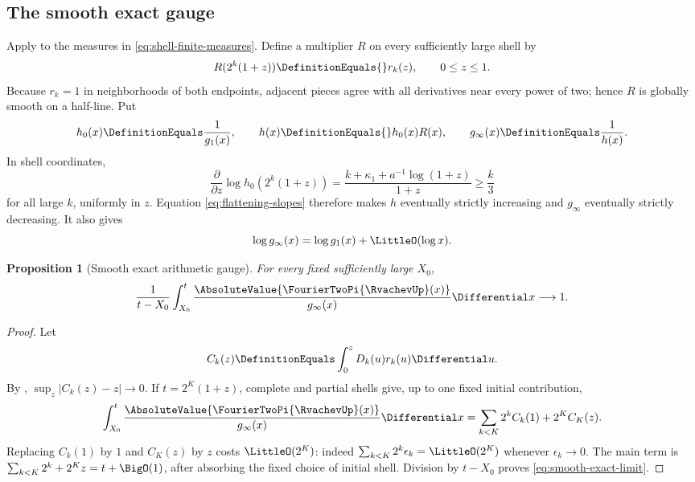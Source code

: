 \documentclass[11pt,oneside]{article}
\numberwithin{equation}{section}
\newtheorem{proposition}[theorem]{Proposition}
\theoremstyle{definition}
\theoremstyle{remark}
\begin{document}
\subsection{The smooth exact gauge}

Apply  to the measures in
\eqref{eq:shell-finite-measures}.  Define a multiplier $R$ on every sufficiently large
shell by
\begin{equation}
 R(2^k(1+z))\DefinitionEquals{}r_k(z),
 \qquad 0\le z\le1.
 \label{eq:R-global}
\end{equation}
Because $r_k=1$ in neighborhoods of both endpoints, adjacent pieces agree with all
derivatives near every power of two; hence $R$ is globally smooth on a half-line.  Put
\begin{equation}
 h_0(x)\DefinitionEquals\frac1{g_1(x)},
 \qquad h(x)\DefinitionEquals{}h_0(x)R(x),
 \qquad g_\infty(x)\DefinitionEquals\frac1{h(x)}.
 \label{eq:smooth-adaptive-gauge}
\end{equation}
In shell coordinates,
\begin{equation}
 \frac{\partial}{\partial z}\log h_0(2^k(1+z))
 =\frac{k+\kappa_1+a^{-1}\log(1+z)}{1+z}\ge\frac{k}{3}
 \label{eq:baseline-slope}
\end{equation}
for all large $k$, uniformly in $z$.  Equation \eqref{eq:flattening-slopes} therefore makes
$h$ eventually strictly increasing and $g_\infty$ eventually strictly decreasing.  It also
gives
\begin{equation}
 \log g_\infty(x)=\log g_1(x)+\LittleO(\log x).
 \label{eq:smooth-rough-scale}
\end{equation}

\begin{proposition}[Smooth exact arithmetic gauge]
\label{prop:smooth-adaptive}
For every fixed sufficiently large $X_0$,
\begin{equation}
 \frac1{t-X_0}\int_{X_0}^{t}
 \frac{\AbsoluteValue{\FourierTwoPi{\RvachevUp}(x)}}{g_\infty(x)}\Differential x\longrightarrow1.
 \label{eq:smooth-exact-limit}
\end{equation}
\end{proposition}

\begin{proof}
Let
\[
 C_k(z)\DefinitionEquals\int_0^zD_k(u)r_k(u)\Differential u.
\]
By , $\sup_z|C_k(z)-z|\to0$.  If
$t=2^K(1+z)$, complete and partial shells give, up to one fixed initial contribution,
\[
 \int_{X_0}^{t}\frac{\AbsoluteValue{\FourierTwoPi{\RvachevUp}(x)}}{g_\infty(x)}\Differential x
 =\sum_{k<K}2^kC_k(1)+2^KC_K(z).
\]
Replacing $C_k(1)$ by $1$ and $C_K(z)$ by $z$ costs $\LittleO(2^K)$: indeed
$\sum_{k<K}2^k\epsilon_k=\LittleO(2^K)$ whenever $\epsilon_k\to0$.  The main term is
$\sum_{k<K}2^k+2^Kz=t+\BigO(1)$, after absorbing the fixed choice of initial shell.
Division by $t-X_0$ proves \eqref{eq:smooth-exact-limit}.
\end{proof}
\end{document}
